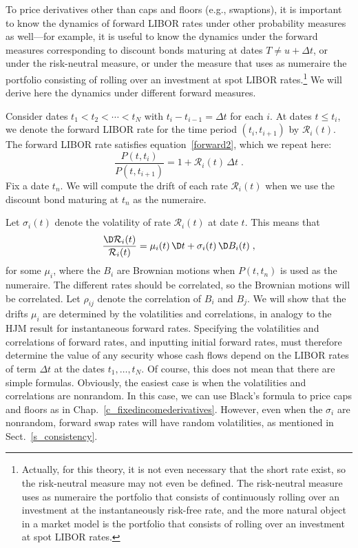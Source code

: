 To price derivatives other than caps and floors (e.g., swaptions), it is important to know the dynamics of forward LIBOR rates under other probability measures as well---for example, it is useful to know the dynamics under the forward measures corresponding to discount bonds maturing at dates $T \neq u+\varDelta t$, or under the risk-neutral measure, or under the measure that uses as numeraire the portfolio consisting of rolling over an investment at spot LIBOR rates.\footnote{Actually, for this theory, it is not even necessary that the short rate exist, so the risk-neutral measure may not even be defined.  The risk-neutral measure uses as numeraire the portfolio that consists of continuously rolling over an investment at the instantaneously risk-free rate, and the more natural object in a market model is the portfolio that consists of rolling over an investment at spot LIBOR rates.}  We will derive here the dynamics under different forward measures.

Consider dates $t_1 < t_2 < \cdots < t_N$ with $t_i-t_{i-1} = \varDelta t$ for each $i$.  At dates $t\leq t_i$, we denote the forward LIBOR rate for the time period $(t_i, t_{i+1} )$ by $\mathcal{R}_i(t)$.  The forward LIBOR rate satisfies equation~\eqref{forward2}, which we repeat here:
\begin{equation}\label{marketmodel1}
\frac{P(t,t_i)}{P(t,t_{i+1})}=1+\mathcal{R}_i(t)\,\varDelta t\;.
\end{equation}
Fix a date $t_n$.  We will compute the drift of each rate $\mathcal{R}_i(t)$ when we use the discount bond maturing at $t_{n}$ as the numeraire.  

Let $\sigma_i(t)$ denote the volatility of rate $\mathcal{R}_i(t)$ at date $t$.  This means that
\begin{equation}\label{marketmodel3}
\frac{\D \mathcal{R}_i(t)}{\mathcal{R}_i(t)} = \mu_i(t)\,\D t + \sigma_i(t)\,\D B_i(t)\;,
\end{equation}
for some $\mu_i$, where the $B_i$ are Brownian motions when $P(t,t_n)$ is used as the numeraire.  The different rates should be correlated, so the Brownian motions will be correlated.  Let $\rho_{ij}$ denote the correlation of $B_i$ and $B_j$.
We will show that the drifts $\mu_i$ are determined by the volatilities and correlations, in analogy to the HJM result for instantaneous forward rates.  
Specifying the volatilities and correlations of  forward rates, and inputting initial  forward rates, must therefore determine the value of any security whose cash flows depend on the LIBOR rates of term $\varDelta t$ at the dates $t_1, \ldots, t_N$.  Of course, this does not mean that there are simple formulas.  Obviously, the easiest case is when the volatilities and correlations are nonrandom.  In this case, we can use Black's formula to price caps and floors as in Chap.~\ref{c_fixedincomederivatives}.  However, even when the $\sigma_i$ are nonrandom, forward swap rates will have random volatilities, as mentioned in 
Sect.~\ref{s_consistency}.

